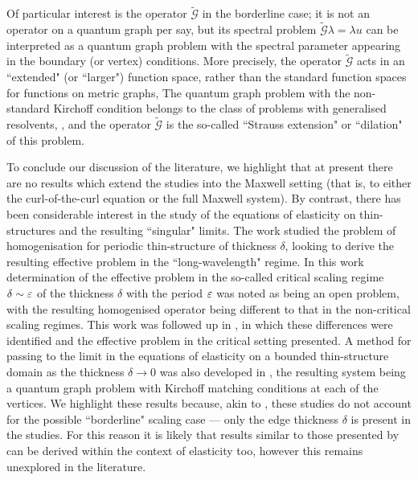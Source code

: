 Of particular interest is the operator $\tilde{\mathcal{G}}$ in the borderline case; it is not an operator on a quantum graph per say, but its spectral problem $\tilde{\mathcal{G}}\lambda = \lambda u$ can be interpreted as a quantum graph problem with the spectral parameter appearing in the boundary (or vertex) conditions.
More precisely, the operator $\tilde{\mathcal{G}}$ acts in an ``extended" (or ``larger") function space, rather than the standard function spaces for functions on metric graphs, 
The quantum graph problem with the non-standard Kirchoff condition belongs to the class of problems with generalised resolvents, , and the operator $\tilde{\mathcal{G}}$ is the so-called ``Strauss extension" or ``dilation" of this problem.

To conclude our discussion of the literature, we highlight that at present there are no results which extend the studies \cite{kuchment2001convergence, exner2005convergence} into the Maxwell setting (that is, to either the curl-of-the-curl equation or the full Maxwell system).
By contrast, there has been considerable interest in the study of the equations of elasticity on thin-structures and the resulting ``singular" limits.
The work \cite{zhikov2002homogenization} studied the problem of homogenisation for periodic thin-structure of thickness $\delta$, looking to derive the resulting effective problem in the ``long-wavelength" regime.
In this work determination of the effective problem in the so-called critical scaling regime $\delta\sim\varepsilon$ of the thickness $\delta$ with the period $\varepsilon$ was noted as being an open problem, with the resulting homogenised operator being different to that in the non-critical scaling regimes.
This work was followed up in \cite{zhikov2003homogenization}, in which these differences were identified and the effective problem in the critical setting presented.
A method for passing to the limit in the equations of elasticity on a bounded thin-structure domain as the thickness $\delta\rightarrow0$ was also developed in \cite{zhikov2006derivation}, the resulting system being a quantum graph problem with Kirchoff matching conditions at each of the vertices.
We highlight these results because, akin to \cite{kuchment2001convergence}, these studies do not account for the possible ``borderline" scaling case --- only the edge thickness $\delta$ is present in the studies.
For this reason it is likely that results similar to those presented by \cite{exner2005convergence} can be derived within the context of elasticity too, however this remains unexplored in the literature.

